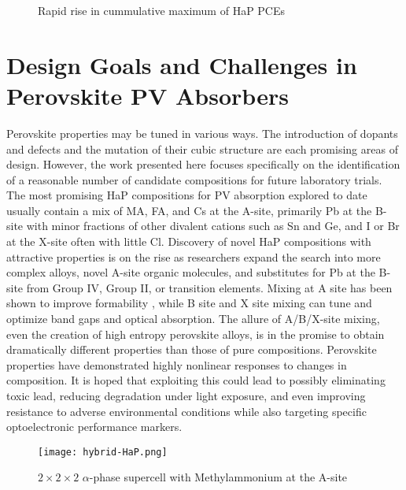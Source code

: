  
\begin{figure}[htbp]
\centering

\caption{\label{fig:nrel} Rapid rise in cummulative maximum of HaP PCEs}
\end{figure}

\section{Design Goals and Challenges in Perovskite PV Absorbers}
\label{sec:org4dbc018}
Perovskite properties may be tuned in various ways.
The introduction of dopants and defects \autocite{kim-2020-upper-limit,dahliah-2021-high-throug} and the mutation of their cubic structure \autocite{kar-2018-comput-screen,kim-2017-hybrid-organ} are each promising areas of design.
However, the work presented here focuses specifically on the identification of a reasonable number of candidate compositions for future laboratory trials.
The most promising HaP compositions for PV absorption explored to date usually contain a mix of MA, FA, and Cs at the A-site, primarily Pb at the B-site with minor fractions of other divalent cations such as Sn and Ge, and I or Br at the X-site often with little Cl.
Discovery of novel HaP compositions with attractive properties is on the rise as researchers expand the search into more complex alloys, novel A-site organic molecules, and substitutes for Pb at the B-site from Group IV, Group II, or transition elements.
\autocite{zhu-2019-struc-elect,banerjee-2019-rashb-trigg,ding-2019-cesium-decreas,greenland-2020-correl-phase}
Mixing at A site has been shown to improve formability \autocite{zhang-2019-perov-photov}, while B site and X site mixing can tune and optimize band gaps and optical absorption.
The allure of A/B/X-site mixing, even the creation of high entropy perovskite alloys, is in the promise to obtain dramatically different properties than those of pure compositions.
Perovskite properties have demonstrated highly nonlinear responses to changes in composition.
It is hoped that exploiting this could lead to possibly eliminating toxic lead, reducing degradation under light exposure, and even improving resistance to adverse environmental conditions while also targeting specific optoelectronic performance markers.

\begin{figure}[htbp]
\centering
\texttt{[image: hybrid-HaP.png]}
\caption{\(2\times{}2\times{}2\) \(\alpha\)-phase supercell with Methylammonium at the A-site}
\end{figure}

